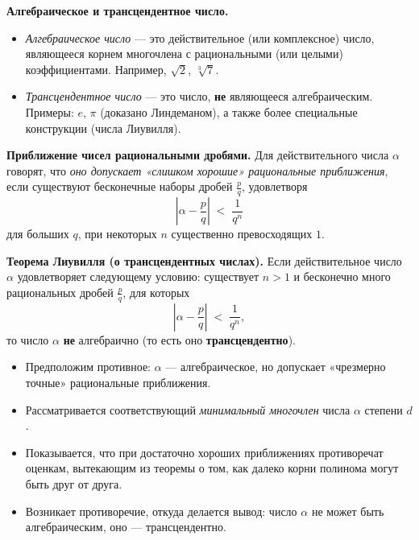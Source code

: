 

\textbf{Алгебраическое и трансцендентное число.}
\begin{itemize}
  \item \emph{Алгебраическое число} — это действительное (или комплексное) число, являющееся корнем многочлена с рациональными (или целыми) коэффициентами. Например, $\sqrt{2}$, $\sqrt[3]{7}$.
  \item \emph{Трансцендентное число} — это число, \textbf{не} являющееся алгебраическим. Примеры: $e$, $\pi$ (доказано Линдеманом), а также более специальные конструкции (числа Лиувилля).
\end{itemize}

\textbf{Приближение чисел рациональными дробями.}
Для действительного числа $\alpha$ говорят, что \emph{оно допускает «слишком хорошие» рациональные приближения}, если существуют бесконечные наборы дробей $\tfrac{p}{q}$, удовлетворя 
\[
\left|\alpha - \frac{p}{q}\right| \;<\; \frac{1}{q^n}
\]
для больших $q$, при некоторых $n$ существенно превосходящих $1$.

\medskip


\textbf{Теорема Лиувилля (о трансцендентных числах).}
Если действительное число $\alpha$ удовлетворяет следующему условию: существует $n>1$ и бесконечно много рациональных дробей $\tfrac{p}{q}$, для которых
\[
\left|\alpha - \frac{p}{q}\right| \;<\; \frac{1}{q^n},
\]
то число $\alpha$ \textbf{не} алгебраично (то есть оно \textbf{трансцендентно}).

\medskip


\begin{itemize}
  \item Предположим противное: $\alpha$ — алгебраическое, но допускает «чрезмерно точные» рациональные приближения.  
  \item Рассматривается соответствующий \emph{минимальный многочлен} числа $\alpha$ степени $d$.  
  \item Показывается, что при достаточно хороших приближениях противоречат оценкам, вытекающим из теоремы о том, как далеко корни полинома могут быть друг от друга.  
  \item Возникает противоречие, откуда делается вывод: число $\alpha$ не может быть алгебраическим, оно — трансцендентно.
\end{itemize}

